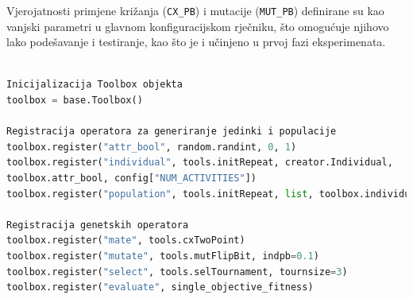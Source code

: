Vjerojatnosti primjene križanja (\texttt{CX\_PB}) i mutacije (\texttt{MUT\_PB}) definirane su kao vanjski parametri u glavnom konfiguracijskom rječniku, što omogućuje njihovo lako podešavanje i testiranje, kao što je i učinjeno u prvoj fazi eksperimenata.
\begin{lstlisting}[language=Python, caption={Primjer konfiguracije DEAP Toolbox-a za genetske operatore.}, label={lst:toolbox}]

Inicijalizacija Toolbox objekta
toolbox = base.Toolbox()

Registracija operatora za generiranje jedinki i populacije
toolbox.register("attr_bool", random.randint, 0, 1)
toolbox.register("individual", tools.initRepeat, creator.Individual,
toolbox.attr_bool, config["NUM_ACTIVITIES"])
toolbox.register("population", tools.initRepeat, list, toolbox.individual)

Registracija genetskih operatora
toolbox.register("mate", tools.cxTwoPoint)
toolbox.register("mutate", tools.mutFlipBit, indpb=0.1)
toolbox.register("select", tools.selTournament, tournsize=3)
toolbox.register("evaluate", single_objective_fitness)
\end{lstlisting}

